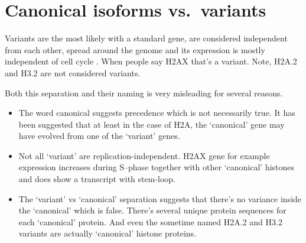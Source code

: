 \documentclass[10pt,a4paper,twocolumn,article]{memoir}
\newcommand{\addref}[1][]{\todo[color=red!40,size=\tiny]{Add reference: #1}}
\begin{document}

  \section{Canonical isoforms vs.~variants}

    Variants are the most likely with a standard gene, are considered independent from each other,
    spread around the genome and its expression is mostly independent of cell cycle . When people say H2AX that's
    a variant. Note, H2A.2 and H3.2 are not considered variants.

    Both this separation and their naming is very misleading 
    for several reasons.
    \begin{itemize}
      \item The word canonical suggests precedence which is not necessarily true. It has been
            suggested that at least in the case of H2A, the `canonical' gene may have evolved
            from one of the `variant' genes\addref.
      \item Not all `variant' are replication-independent. H2AX gene for example expression
            increases during S--phase together with other `canonical' histones and does show
            a transcript with stem-loop.
      \item The `variant' vs `canonical' separation suggests that there's no variance inside
            the `canonical' which is false. There's several unique protein sequences for each
            `canonical' protein. And even the sometime named H2A.2 and H3.2 variants are actually
            `canonical' histone proteins.
    \end{itemize}
\end{document}
